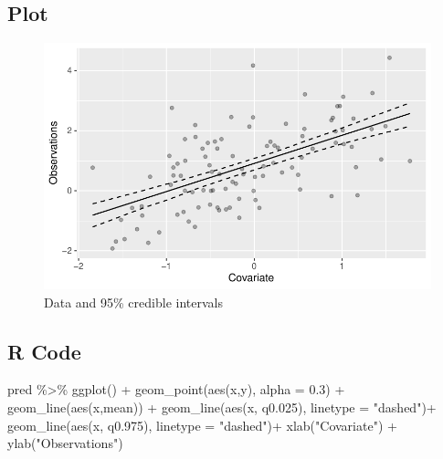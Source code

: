 \documentclass[
  letterpaper,
  DIV=11,
  numbers=noendperiod]{scrartcl}
\newenvironment{Shaded}{\begin{snugshade}}{\end{snugshade}}
\newcommand{\AttributeTok}[1]{\textcolor[rgb]{0.40,0.45,0.13}{#1}}
\newcommand{\FloatTok}[1]{\textcolor[rgb]{0.68,0.00,0.00}{#1}}
\newcommand{\FunctionTok}[1]{\textcolor[rgb]{0.28,0.35,0.67}{#1}}
\newcommand{\NormalTok}[1]{\textcolor[rgb]{0.00,0.23,0.31}{#1}}
\newcommand{\SpecialCharTok}[1]{\textcolor[rgb]{0.37,0.37,0.37}{#1}}
\newcommand{\StringTok}[1]{\textcolor[rgb]{0.13,0.47,0.30}{#1}}
\begin{document}
\subsection{Plot}

\begin{figure}[H]

{\centering \includegraphics{day1_practical_files/figure-pdf/unnamed-chunk-18-1.pdf}

}

\caption{Data and 95\% credible intervals}

\end{figure}%

\subsection{R Code}

\begin{Shaded}
\begin{Highlighting}[]
\NormalTok{pred }\SpecialCharTok{\%\textgreater{}\%} \FunctionTok{ggplot}\NormalTok{() }\SpecialCharTok{+} 
  \FunctionTok{geom\_point}\NormalTok{(}\FunctionTok{aes}\NormalTok{(x,y), }\AttributeTok{alpha =} \FloatTok{0.3}\NormalTok{) }\SpecialCharTok{+}
  \FunctionTok{geom\_line}\NormalTok{(}\FunctionTok{aes}\NormalTok{(x,mean)) }\SpecialCharTok{+}
  \FunctionTok{geom\_line}\NormalTok{(}\FunctionTok{aes}\NormalTok{(x, q0}\FloatTok{.025}\NormalTok{), }\AttributeTok{linetype =} \StringTok{"dashed"}\NormalTok{)}\SpecialCharTok{+}
  \FunctionTok{geom\_line}\NormalTok{(}\FunctionTok{aes}\NormalTok{(x, q0}\FloatTok{.975}\NormalTok{), }\AttributeTok{linetype =} \StringTok{"dashed"}\NormalTok{)}\SpecialCharTok{+}
  \FunctionTok{xlab}\NormalTok{(}\StringTok{"Covariate"}\NormalTok{) }\SpecialCharTok{+} \FunctionTok{ylab}\NormalTok{(}\StringTok{"Observations"}\NormalTok{)}
\end{Highlighting}
\end{Shaded}
\end{document}

